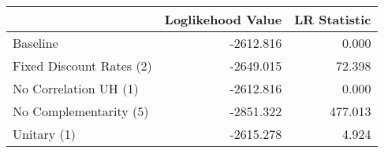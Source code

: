 \begin{tabular}{lrr}
\toprule
{} & Loglikehood Value & LR Statistic \\
\midrule
Baseline                 &         -2612.816 &        0.000 \\
Fixed Discount Rates (2) &         -2649.015 &       72.398 \\
No Correlation UH (1)    &         -2612.816 &        0.000 \\
No Complementarity (5)   &         -2851.322 &      477.013 \\
Unitary (1)              &         -2615.278 &        4.924 \\
\bottomrule
\end{tabular}
